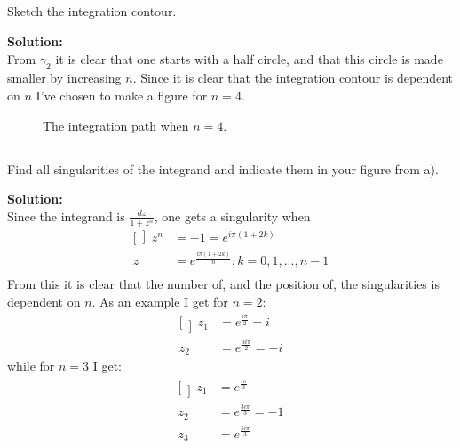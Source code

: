 \documentclass[a4paper,12pt]{article}
\begin{document}
\subsection{}
Sketch the integration contour.

\textbf{Solution:}\\
From $\gamma_2$ it is clear that one starts with a half circle, and that this circle is made smaller by increasing $n$. Since it is clear that the integration contour is dependent on $n$ I've chosen to make a figure for $n=4$. 
\begin{figure}[H]
	\begin{center}
	\caption{The integration path when $n=4$.}
	\end{center}
\end{figure}

\subsection{}
Find all singularities of the integrand and indicate them in your figure from a).

\textbf{Solution:}\\
Since the integrand is $\frac{dz}{1+z^n}$, one gets a singularity when 
\begin{equation*}
\begin{aligned}[\left]
z^n &= -1 = e^{i\pi(1+2k)}\\
z   &= e^{\frac{i\pi(1+2k)}{n}}; k = 0,1,...,n-1\\
\end{aligned}
\end{equation*}
From this it is clear that the number of, and the position of, the singularities is dependent on $n$.
As an example I get for $n=2$:
\begin{equation*}
\begin{aligned}[\left]
z_1 &= e^{\frac{i\pi}{2}} = i\\
z_2 &= e^{\frac{3i\pi}{2}} = -i
\end{aligned}
\end{equation*}
while for $n=3$ I get:
\begin{equation*}
\begin{aligned}[\left]
z_1 &= e^{\frac{i\pi}{3}} \\
z_2 &= e^{\frac{3i\pi}{3}} = -1\\
z_3 &= e^{\frac{5i\pi}{3}}
\end{aligned}
\end{equation*}
\end{document}
